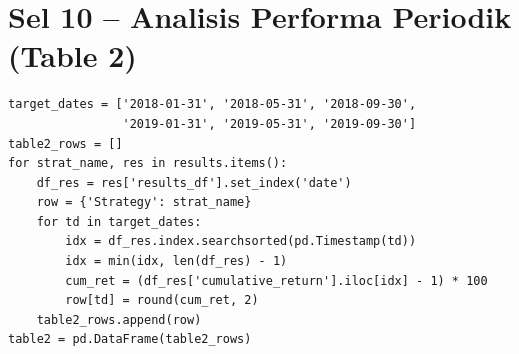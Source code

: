 \documentclass[12pt,a4paper]{article}
\begin{document}
\section{Sel 10 -- Analisis Performa Periodik (Table 2)}

\begin{lstlisting}[caption={Kalkulasi Profit/Loss Kumulatif Periodik (Jan, Mei, Sep)}]
target_dates = ['2018-01-31', '2018-05-31', '2018-09-30',
                '2019-01-31', '2019-05-31', '2019-09-30']
table2_rows = []
for strat_name, res in results.items():
    df_res = res['results_df'].set_index('date')
    row = {'Strategy': strat_name}
    for td in target_dates:
        idx = df_res.index.searchsorted(pd.Timestamp(td))
        idx = min(idx, len(df_res) - 1)
        cum_ret = (df_res['cumulative_return'].iloc[idx] - 1) * 100
        row[td] = round(cum_ret, 2)
    table2_rows.append(row)
table2 = pd.DataFrame(table2_rows)
\end{lstlisting}
\end{document}
